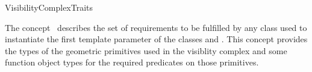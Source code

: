 
\ccRefPageBegin

\begin{ccRefConcept}{VisibilityComplexTraits}
\label{pageVisibilityComplexTraitsRef}

\ccDefinition

The concept \ccRefName\  describes the set of requirements to be fulfilled by
any class used to instantiate the first template parameter of the classes
 and
.  This concept provides the
types of the geometric primitives used in the visiblity complex and some
function object types for the required predicates on those primitives. 

\ccTypes
{}
\ccThreeToTwo

\ccGlue
{}
\ccGlue
{}
\ccGlue
{}
\ccGlue
{}


\end{ccRefConcept}
